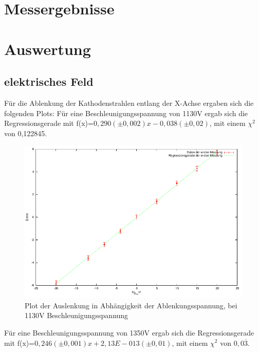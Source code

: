 \documentclass[12pt]{scrartcl}
\begin{document}
\section{Messergebnisse}



\section{Auswertung}
\subsection{elektrisches Feld}
Für die Ablenkung der Kathodenstrahlen entlang der X-Achse ergaben sich die folgenden Plots:
\newpage
Für eine Beschleunigungsspannung von 1130V ergab sich die Regressionsgerade mit f(x)=$0,290 (\pm 0,002 ) x  - 0,038 (\pm 0,02)$, mit einem $\chi^2$ von 0,122845.


\begin{figure}[htbp] 
  \centering
    \includegraphics[scale = 1]{x_1.pdf}
  	\caption[Plot der Auslenkung in Abhängigkeit der Ablenkungsspannung, bei 1130V Beschleunigungsspannung]{Plot der Auslenkung in Abhängigkeit der Ablenkungsspannung, bei 1130V Beschleunigungsspannung}
  \label{fig:x_1}
\end{figure}



\newpage

Für eine Beschleunigungsspannung von 1350V ergab sich die Regressionsgerade mit f(x)=$0,246 (\pm 0,001) x  + 2,13E-013	 (\pm 0,01)$, mit einem $\chi^2$ von $0,0\overline{3}$. %
\end{document}
